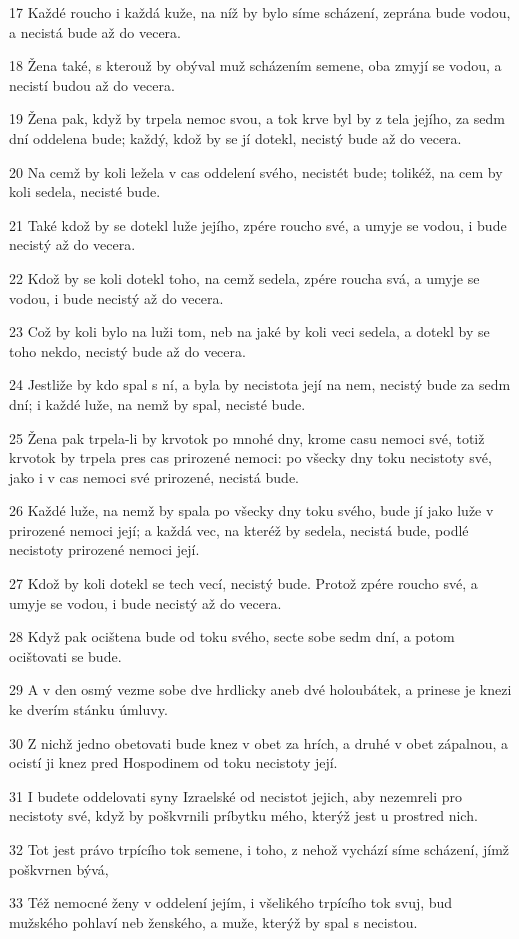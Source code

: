\par 17 Každé roucho i každá kuže, na níž by bylo síme scházení, zeprána bude vodou, a necistá bude až do vecera.
\par 18 Žena také, s kterouž by obýval muž scházením semene, oba zmyjí se vodou, a necistí budou až do vecera.
\par 19 Žena pak, když by trpela nemoc svou, a tok krve byl by z tela jejího, za sedm dní oddelena bude; každý, kdož by se jí dotekl, necistý bude až do vecera.
\par 20 Na cemž by koli ležela v cas oddelení svého, necistét bude; tolikéž, na cem by koli sedela, necisté bude.
\par 21 Také kdož by se dotekl luže jejího, zpére roucho své, a umyje se vodou, i bude necistý až do vecera.
\par 22 Kdož by se koli dotekl toho, na cemž sedela, zpére roucha svá, a umyje se vodou, i bude necistý až do vecera.
\par 23 Což by koli bylo na luži tom, neb na jaké by koli veci sedela, a dotekl by se toho nekdo, necistý bude až do vecera.
\par 24 Jestliže by kdo spal s ní, a byla by necistota její na nem, necistý bude za sedm dní; i každé luže, na nemž by spal, necisté bude.
\par 25 Žena pak trpela-li by krvotok po mnohé dny, krome casu nemoci své, totiž krvotok by trpela pres cas prirozené nemoci: po všecky dny toku necistoty své, jako i v cas nemoci své prirozené, necistá bude.
\par 26 Každé luže, na nemž by spala po všecky dny toku svého, bude jí jako luže v prirozené nemoci její; a každá vec, na kteréž by sedela, necistá bude, podlé necistoty prirozené nemoci její.
\par 27 Kdož by koli dotekl se tech vecí, necistý bude. Protož zpére roucho své, a umyje se vodou, i bude necistý až do vecera.
\par 28 Když pak ocištena bude od toku svého, secte sobe sedm dní, a potom ocištovati se bude.
\par 29 A v den osmý vezme sobe dve hrdlicky aneb dvé holoubátek, a prinese je knezi ke dverím stánku úmluvy.
\par 30 Z nichž jedno obetovati bude knez v obet za hrích, a druhé v obet zápalnou, a ocistí ji knez pred Hospodinem od toku necistoty její.
\par 31 I budete oddelovati syny Izraelské od necistot jejich, aby nezemreli pro necistoty své, když by poškvrnili príbytku mého, kterýž jest u prostred nich.
\par 32 Tot jest právo trpícího tok semene, i toho, z nehož vychází síme scházení, jímž poškvrnen bývá,
\par 33 Též nemocné ženy v oddelení jejím, i všelikého trpícího tok svuj, bud mužského pohlaví neb ženského, a muže, kterýž by spal s necistou.

